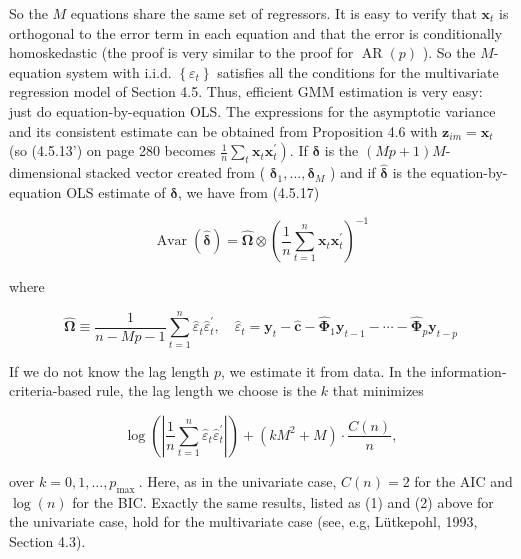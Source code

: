 \documentclass[10pt]{article}
\begin{document}
So the $M$ equations share the same set of regressors. It is easy to verify that $\mathbf{x}_{t}$ is orthogonal to the error term in each equation and that the error is conditionally homoskedastic (the proof is very similar to the proof for $\operatorname{AR}(p)$ ). So the $M$-equation system with i.i.d. $\left\{\varepsilon_{t}\right\}$ satisfies all the conditions for the multivariate regression model of Section 4.5. Thus, efficient GMM estimation is very easy:\\
just do equation-by-equation OLS. The expressions for the asymptotic variance and its consistent estimate can be obtained from Proposition 4.6 with $\mathbf{z}_{i m}=\mathbf{x}_{t}$ (so (4.5.13') on page 280 becomes $\left.\frac{1}{n} \sum_{t} \mathbf{x}_{t} \mathbf{x}_{t}^{\prime}\right)$. If $\boldsymbol{\delta}$ is the $(M p+1) M$-dimensional stacked vector created from ( $\boldsymbol{\delta}_{1}, \ldots, \boldsymbol{\delta}_{M}$ ) and if $\hat{\boldsymbol{\delta}}$ is the equation-by-equation OLS estimate of $\boldsymbol{\delta}$, we have from (4.5.17)


\begin{equation*}
\widehat{\operatorname{Avar}(\hat{\boldsymbol{\delta}})}=\widehat{\boldsymbol{\Omega}} \otimes\left(\frac{1}{n} \sum_{t=1}^{n} \mathbf{x}_{t} \mathbf{x}_{t}^{\prime}\right)^{-1} \tag{6.4.10}
\end{equation*}


where


\begin{equation*}
\widehat{\boldsymbol{\Omega}} \equiv \frac{1}{n-M p-1} \sum_{t=1}^{n} \hat{\varepsilon}_{t} \hat{\varepsilon}_{t}^{\prime}, \quad \hat{\varepsilon}_{t}=\mathbf{y}_{t}-\hat{\mathbf{c}}-\widehat{\boldsymbol{\Phi}}_{1} \mathbf{y}_{t-1}-\cdots-\widehat{\boldsymbol{\Phi}}_{p} \mathbf{y}_{t-p} \tag{6.4.11}
\end{equation*}


If we do not know the lag length $p$, we estimate it from data. In the information-criteria-based rule, the lag length we choose is the $k$ that minimizes


\begin{equation*}
\log \left(\left|\frac{1}{n} \sum_{t=1}^{n} \hat{\varepsilon}_{t} \hat{\varepsilon}_{t}^{\prime}\right|\right)+\left(k M^{2}+M\right) \cdot \frac{C(n)}{n}, \tag{6.4.12}
\end{equation*}


over $k=0,1, \ldots, p_{\text {max }}$. Here, as in the univariate case, $C(n)=2$ for the AIC and $\log (n)$ for the BIC. Exactly the same results, listed as (1) and (2) above for the univariate case, hold for the multivariate case (see, e.g, Lütkepohl, 1993, Section 4.3).
\end{document}

